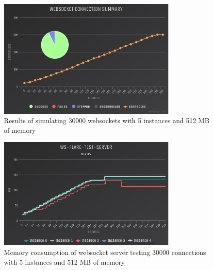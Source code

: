 \begin{table}[H]
\caption{Cloud Foundry Resource Limits}
\label{table:cf-resource-limits-5}
\end{table}

\begin{figure}[H]
  \centering
    \includegraphics[width=0.8\textwidth]{figures/experiments/experiment-1/node-js/conn-summary-30000-5-instances-512-memory.png}
    \caption{Results of simulating 30000 websockets with 5 instances and 512 MB of memory}
    \label{fig:experiment-3-conn-summary-30000-5-instances-512-mem}
\end{figure}

\begin{figure}[H]
  \centering
    \includegraphics[width=0.8\textwidth]{figures/experiments/experiment-1/node-js/memory-30000-5-instances-512-memory.png}
    \caption{Memory consumption of websocket server testing 30000 connections with 5 instances and 512 MB of memory}
    \label{fig:experiment-3-memory-30000-5-instances-512-mem}
\end{figure}

